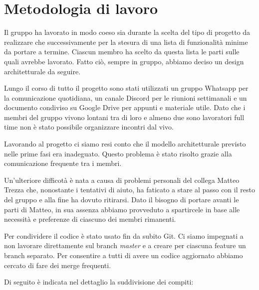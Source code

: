 \documentclass[a4paper,12pt]{report}
\begin{document}
\section{Metodologia di lavoro}
Il gruppo ha lavorato in modo coeso sia durante la scelta del tipo di progetto da realizzare che successivamente per la stesura di una lista di funzionalità minime da portare a termine. Ciascun membro ha scelto da questa lista le parti sulle quali avrebbe lavorato. Fatto ciò, sempre in gruppo, abbiamo deciso un design architetturale da seguire. 

Lungo il corso di tutto il progetto sono stati utilizzati un gruppo Whatsapp per la comunicazione quotidiana, un canale Discord per le riunioni settimanali e un documento condiviso su Google Drive per appunti e materiale utile. Dato che i membri del gruppo vivono lontani tra di loro e almeno due sono lavoratori full time non è stato possibile organizzare incontri dal vivo. 

Lavorando al progetto ci siamo resi conto che il modello architetturale previsto nelle prime fasi era inadeguato. Questo problema è stato risolto grazie alla comunicazione frequente tra i membri. 

Un'ulteriore difficotà è nata a causa di problemi personali del collega Matteo Trezza che, nonostante i tentativi di aiuto, ha faticato a stare al passo con il resto del gruppo e alla fine ha dovuto ritirarsi. Dato il bisogno di portare avanti le parti di Matteo, in sua assenza abbiamo provveduto a spartircele in base alle necessità e preferenze di ciascuno dei membri rimanenti.

Per condividere il codice è stato usato fin da subito Git. Ci siamo impegnati a non lavorare direttamente sul branch \textit{master} e a creare per ciascuna feature un branch separato. Per consentire a tutti di avere un codice aggiornato abbiamo cercato di fare dei merge frequenti.

Di seguito è indicata nel dettaglio la suddivisione dei compiti:
\end{document}
